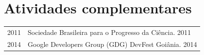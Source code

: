 \documentclass[12pt, oneside, openany, a4paper, english, brazil]{abntex2}
\begin{document}

\section{Atividades complementares}

\begin{tabular}{rl}
2011 & Sociedade Brasileira para o Progresso da Ciência. 2011 \\
2014 & Google Developers Group (GDG) DevFest Goiânia. 2014 \\
\end{tabular}
\end{document}
